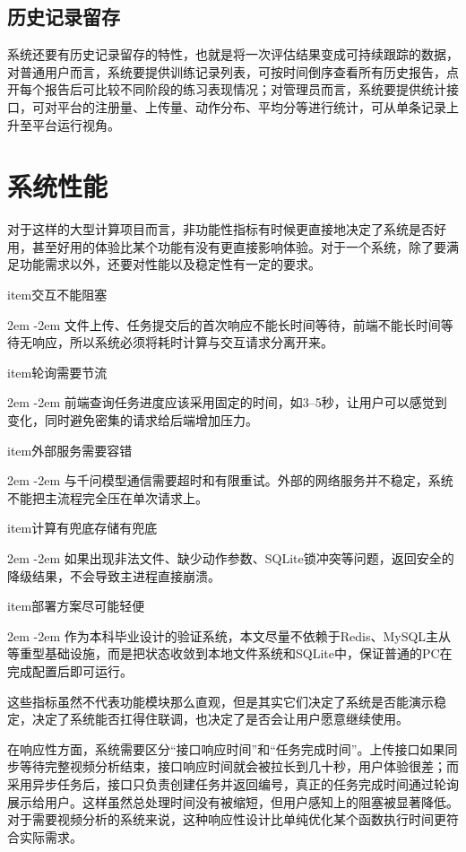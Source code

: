 \documentclass[UTF8,twoside]{ctexrep}
\makeatletter
\def@NAT@last@yr{\@citea}%
\def@NAT@last@yr{-\NAT@penalty}%
\newcommand{\listbodyaligntext}[1]{%
  \par\begingroup
    \parindent=0pt
    \parshape=2 2em \dimexpr\textwidth-2em\relax 0pt \textwidth
    \noindent\ignorespaces#1\unskip\par
  \endgroup
}
\newcommand{\researchitem}[2]{%
  \csname item\endcsname #1%
  \listbodyaligntext{#2}%
}
\makeatother
\begin{document}
\subsection{历史记录留存}
系统还要有历史记录留存的特性，也就是将一次评估结果变成可持续跟踪的数据，对普通用户而言，系统要提供训练记录列表，可按时间倒序查看所有历史报告，点开每个报告后可比较不同阶段的练习表现情况；对管理员而言，系统要提供统计接口，可对平台的注册量、上传量、动作分布、平均分等进行统计，可从单条记录上升至平台运行视角。

\section{系统性能}
对于这样的大型计算项目而言，非功能性指标有时候更直接地决定了系统是否好用，甚至好用的体验比某个功能有没有更直接影响体验。对于一个系统，除了要满足功能需求以外，还要对性能以及稳定性有一定的要求。

\begin{researchlist}
  
\researchitem{交互不能阻塞}{
    文件上传、任务提交后的首次响应不能长时间等待，前端不能长时间等待无响应，所以系统必须将耗时计算与交互请求分离开来。
  }
  
\researchitem{轮询需要节流}{
    前端查询任务进度应该采用固定的时间，如3--5秒，让用户可以感觉到变化，同时避免密集的请求给后端增加压力。
  }
  
\researchitem{外部服务需要容错}{
    与千问模型通信需要超时和有限重试。外部的网络服务并不稳定，系统不能把主流程完全压在单次请求上。
  }
  
\researchitem{计算有兜底存储有兜底}{
    如果出现非法文件、缺少动作参数、SQLite锁冲突等问题，返回安全的降级结果，不会导致主进程直接崩溃。
  }
  
\researchitem{部署方案尽可能轻便}{
    作为本科毕业设计的验证系统，本文尽量不依赖于Redis、MySQL主从等重型基础设施，而是把状态收敛到本地文件系统和SQLite中，保证普通的PC在完成配置后即可运行。
  }
\end{researchlist}

这些指标虽然不代表功能模块那么直观，但是其实它们决定了系统是否能演示稳定，决定了系统能否扛得住联调，也决定了是否会让用户愿意继续使用。

在响应性方面，系统需要区分“接口响应时间”和“任务完成时间”。上传接口如果同步等待完整视频分析结束，接口响应时间就会被拉长到几十秒，用户体验很差；而采用异步任务后，接口只负责创建任务并返回编号，真正的任务完成时间通过轮询展示给用户。这样虽然总处理时间没有被缩短，但用户感知上的阻塞被显著降低。对于需要视频分析的系统来说，这种响应性设计比单纯优化某个函数执行时间更符合实际需求。
\end{document}
